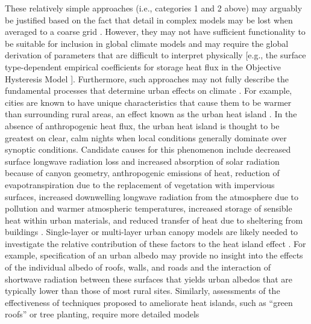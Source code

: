 \documentclass[12pt,authoryear]{elsarticle}
\numberwithin{equation}{section} %
\begin{document}
These relatively simple approaches (i.e., categories 1 and 2 above) may arguably be justified based on the fact that detail in complex models may be lost when averaged to a coarse grid \citep{tahaModifyingMesoscaleMeteorological1999}. However, they may not have sufficient functionality to be suitable for inclusion in global climate models and may require the global derivation of parameters that are difficult to interpret physically [e.g., the surface type-dependent empirical coefficients for storage heat flux in the Objective Hysteresis Model \citep{grimmondObjectiveUrbanHeat1991}]. Furthermore, such approaches may not fully describe the fundamental processes that determine urban effects on climate \citep{piringerInvestigatingSurfaceEnergy2002}. For example, cities are known to have unique characteristics that cause them to be warmer than surrounding rural areas, an effect known as the urban heat island \citep{okeBoundaryLayerClimates1987}. In the absence of anthropogenic heat flux, the urban heat island is thought to be greatest on clear, calm nights when local conditions generally dominate over synoptic conditions. Candidate causes for this phenomenon include decreased surface longwave radiation loss and increased absorption of solar radiation because of canyon geometry, anthropogenic emissions of heat, reduction of evapotranspiration due to the replacement of vegetation with impervious surfaces, increased downwelling longwave radiation from the atmosphere due to pollution and warmer atmospheric temperatures, increased storage of sensible heat within urban materials, and reduced transfer of heat due to sheltering from buildings \citet{okeEnergeticBasisUrban1982,okeUrbanHeatStorage1987,okeSimulationSurfaceUrban1991}. Single-layer or multi-layer urban canopy models are likely needed to investigate the relative contribution of these factors to
the heat island effect \citep{piringerInvestigatingSurfaceEnergy2002}. For example, specification of an urban albedo may provide no insight into the effects of the individual albedo of roofs, walls, and roads and the interaction of shortwave radiation between these surfaces that yields urban albedos that are typically lower than those of most rural sites. Similarly, assessments of the effectiveness of techniques proposed to ameliorate heat islands, such as ``green roofs'' or tree planting, require more detailed models
\end{document}
